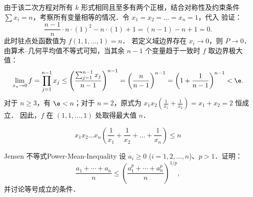 \begin{myproof}
\begin{equation}
    \end{equation}
    由于该二次方程对所有 $k$ 形式相同且至多有两个正根，结合对称性及约束条件 $\sum x_i = n$，考察所有变量相等的情况．令 $x_1 = x_2 = \dots = x_n = 1$，代入  验证：
    \begin{equation}
        \frac{n-1}{n} \cdot n \cdot (1)^2 - n \cdot (1) + 1 = (n-1) - n + 1 = 0.
    \end{equation}
    此时驻点处函数值为 $f(1, 1, \dots, 1) = n$．
    若定义域边界存在 $x_i \to 0$，则 $P \to 0$．由算术--几何平均值不等式可知，当其余 $n-1$ 个变量趋于一致时 $f$ 取边界极大值：
    \begin{equation}
        \lim_{x_n \to 0} f = \prod_{j=1}^{n-1} x_j \le \left( \frac{\sum_{j=1}^{n-1} x_j}{n-1} \right)^{n-1} = \left( \frac{n}{n-1} \right)^{n-1} = \left( 1 + \frac{1}{n-1} \right)^{n-1} < \e.
    \end{equation}
    对于 $n \ge 3$，有 $\e < n$；对于 $n=2$，原式为 $x_1 x_2 (\frac{1}{x_1} + \frac{1}{x_2}) = x_1 + x_2 = 2$ 恒成立．
    因此，$f$ 在 $(1, 1, \dots, 1)$ 处取得最大值 $n$．

    \begin{equation}
        \boxed{x_1 x_2 \dots x_n \left( \frac{1}{x_1} + \frac{1}{x_2} + \dots + \frac{1}{x_n} \right) \le n}
    \end{equation}
\end{myproof}




\begin{problem}{Jensen 不等式}{Power-Mean-Inequality}
    设 $a_i \ge 0$ ($i = 1, 2, \dots, n$)、$p > 1$．证明：
    \begin{equation}
        \frac{a_1 + \cdots + a_n}{n} \le \left( \frac{a_1^p + \cdots + a_n^p}{n} \right)^{1/p},
    \end{equation}
    并讨论等号成立的条件．
\end{problem}

